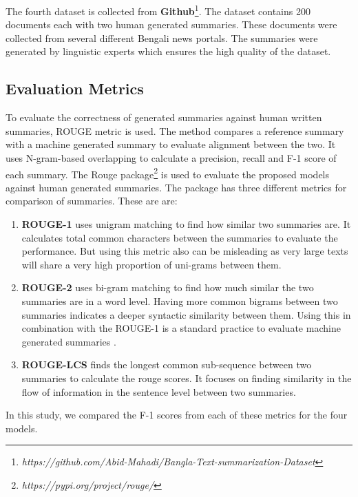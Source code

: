 The fourth dataset is collected from \textbf{Github}\footnote{\textit{https://github.com/Abid-Mahadi/Bangla-Text-summarization-Dataset}}. The dataset contains 200 documents each with two human generated summaries. These documents were collected from several different Bengali news portals. The summaries were generated by linguistic experts which ensures the high quality of the dataset.

\subsection{Evaluation Metrics}\label{subsec:evaluation-metrics}
To evaluate the correctness of generated summaries against human written summaries, ROUGE metric \cite{lin-2004-rouge} is used. The method compares a reference summary with a machine generated summary to evaluate alignment between the two. It uses N-gram-based overlapping to calculate a precision, recall and F-1 score of each summary. The Rouge package\footnote{\textit{https://pypi.org/project/rouge/}} is used to evaluate the proposed models against human generated summaries. The package has three different metrics for comparison of summaries. These are are:

\begin{enumerate}
    \item \textbf{ROUGE-1} uses unigram matching to find how similar two summaries are. It calculates total common characters between the summaries to evaluate the performance. But using this metric also can be misleading as very large texts will share a very high proportion of uni-grams between them.
    
    \item \textbf{ROUGE-2} uses bi-gram matching to find how much similar the two summaries are in a word level. Having more common bigrams between two summaries indicates a deeper syntactic similarity between them. Using this in combination with the ROUGE-1 is a standard practice to evaluate machine generated summaries \cite{wafaa-2021-summary-comprehensive-review}.
    
    \item \textbf{ROUGE-LCS} finds the longest common sub-sequence between two summaries to calculate the rouge scores. It focuses on finding similarity in the flow of information in the sentence level between two summaries.
\end{enumerate}

In this study, we compared the F-1 scores from each of these metrics for the four models.

